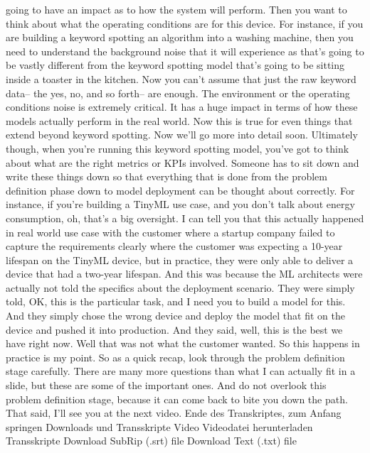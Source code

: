     going to have an impact as to how the system will perform.
    Then you want to think about what the operating
    conditions are for this device.
    For instance, if you are building a keyword
    spotting an algorithm into a washing machine,
    then you need to understand the background noise
    that it will experience as that's going to be vastly
    different from the keyword spotting model that's going to be sitting
    inside a toaster in the kitchen.
    Now you can't assume that just the raw keyword data--
    the yes, no, and so forth-- are enough.
    The environment or the operating conditions noise is extremely critical.
    It has a huge impact in terms of how these models actually
    perform in the real world.
    Now this is true for even things that extend beyond keyword spotting.
    Now we'll go more into detail soon.
    Ultimately though, when you're running this keyword spotting model,
    you've got to think about what are the right metrics or KPIs involved.
    Someone has to sit down and write these things
    down so that everything that is done from the problem definition phase
    down to model deployment can be thought about correctly.
    For instance, if you're building a TinyML use case,
    and you don't talk about energy consumption,
    oh, that's a big oversight.
    I can tell you that this actually happened in real world use
    case with the customer where a startup company failed
    to capture the requirements clearly where the customer was expecting
    a 10-year lifespan on the TinyML device, but in practice, they
    were only able to deliver a device that had a two-year lifespan.
    And this was because the ML architects were actually not told the specifics
    about the deployment scenario.
    They were simply told, OK, this is the particular task,
    and I need you to build a model for this.
    And they simply chose the wrong device and deploy
    the model that fit on the device and pushed it into production.
    And they said, well, this is the best we have right now.
    Well that was not what the customer wanted.
    So this happens in practice is my point.
    So as a quick recap, look through the problem definition stage carefully.
    There are many more questions than what I can actually fit in a slide,
    but these are some of the important ones.
    And do not overlook this problem definition stage,
    because it can come back to bite you down the path.
    That said, I'll see you at the next video.
    Ende des Transkriptes, zum Anfang springen
    Downloads und Transskripte
    Video
    Videodatei herunterladen
    Transskripte
    Download SubRip (.srt) file
    Download Text (.txt) file
    
